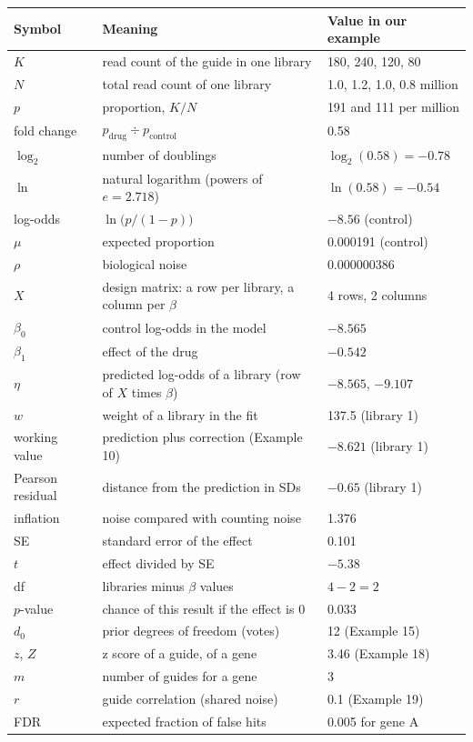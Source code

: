 \documentclass[12pt]{article}
\begin{document}
\begin{center}
\small
\begin{tabular}{@{}l p{6.3cm} l@{}}
\toprule
Symbol & Meaning & Value in our example\\
\midrule
$K$ & read count of the guide in one library & 180, 240, 120, 80\\
$N$ & total read count of one library & 1.0, 1.2, 1.0, 0.8 million\\
$p$ & proportion, $K/N$ & 191 and 111 per million\\
fold change & $p_{\text{drug}} \div p_{\text{control}}$ & 0.58\\
$\log_2$ & number of doublings & $\log_2(0.58) = -0.78$\\
$\ln$ & natural logarithm (powers of $e = 2.718$) & $\ln(0.58) = -0.54$\\
log-odds & $\ln\bigl(p/(1-p)\bigr)$ & $-8.56$ (control)\\
$\mu$ & expected proportion & 0.000191 (control)\\
$\rho$ & biological noise & 0.000000386\\
$X$ & design matrix: a row per library, a column per $\beta$ & 4 rows, 2 columns\\
$\beta_0$ & control log-odds in the model & $-8.565$\\
$\beta_1$ & effect of the drug & $-0.542$\\
$\eta$ & predicted log-odds of a library (row of $X$ times $\beta$) & $-8.565$, $-9.107$\\
$w$ & weight of a library in the fit & 137.5 (library 1)\\
working value & prediction plus correction (Example 10) & $-8.621$ (library 1)\\
Pearson residual & distance from the prediction in SDs & $-0.65$ (library 1)\\
inflation & noise compared with counting noise & 1.376\\
SE & standard error of the effect & 0.101\\
$t$ & effect divided by SE & $-5.38$\\
df & libraries minus $\beta$ values & $4 - 2 = 2$\\
$p$-value & chance of this result if the effect is 0 & 0.033\\
$d_0$ & prior degrees of freedom (votes) & 12 (Example 15)\\
$z$, $Z$ & z score of a guide, of a gene & 3.46 (Example 18)\\
$m$ & number of guides for a gene & 3\\
$r$ & guide correlation (shared noise) & 0.1 (Example 19)\\
FDR & expected fraction of false hits & 0.005 for gene A\\
\bottomrule
\end{tabular}
\end{center}
\end{document}
